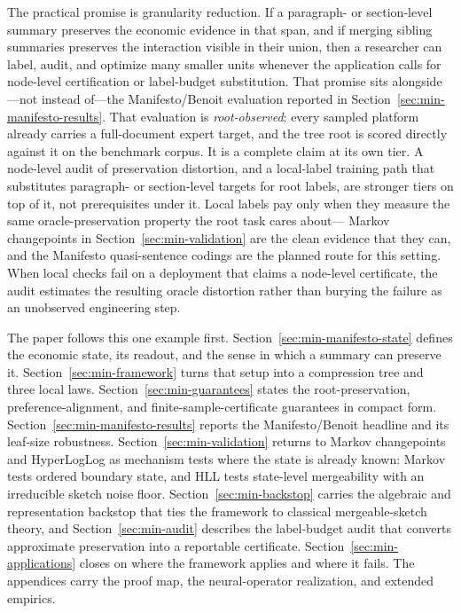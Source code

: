 The practical promise is granularity reduction. If a paragraph- or
section-level summary preserves the economic evidence in that span, and if
merging sibling summaries preserves the interaction visible in their union,
then a researcher can label, audit, and optimize many smaller units whenever
the application calls for node-level certification or label-budget
substitution. That promise sits alongside---not instead of---the
Manifesto/Benoit evaluation reported in
Section~\ref{sec:min-manifesto-results}. That evaluation is
\emph{root-observed}: every sampled platform already carries a full-document
expert target, and the tree root is scored directly against it on the
benchmark corpus. It is a complete claim at its own tier. A node-level audit
of preservation distortion, and a local-label training path that substitutes
paragraph- or section-level targets for root labels, are stronger tiers on
top of it, not prerequisites under it. Local labels pay only when they
measure the same oracle-preservation property the root task cares about---
Markov changepoints in Section~\ref{sec:min-validation} are the clean
evidence that they can, and the Manifesto quasi-sentence codings are the
planned route for this setting. When local checks fail on a deployment that
claims a node-level certificate, the audit estimates the resulting
oracle distortion rather than burying the failure as an unobserved
engineering step.

The paper follows this one example first.
Section~\ref{sec:min-manifesto-state} defines the economic state, its
readout, and the sense in which a summary can preserve it.
Section~\ref{sec:min-framework} turns that setup into a compression tree and
three local laws. Section~\ref{sec:min-guarantees} states the
root-preservation, preference-alignment, and finite-sample-certificate
guarantees in compact form. Section~\ref{sec:min-manifesto-results} reports
the Manifesto/Benoit headline and its leaf-size robustness.
Section~\ref{sec:min-validation} returns to Markov changepoints and
HyperLogLog as mechanism tests where the state is already known: Markov tests
ordered boundary state, and HLL tests state-level mergeability with an
irreducible sketch noise floor. Section~\ref{sec:min-backstop} carries the
algebraic and representation backstop that ties the framework to classical
mergeable-sketch theory, and Section~\ref{sec:min-audit} describes the
label-budget audit that converts approximate preservation into a
reportable certificate. Section~\ref{sec:min-applications} closes on where
the framework applies and where it fails. The appendices carry
the proof map, the neural-operator realization, and extended empirics.
